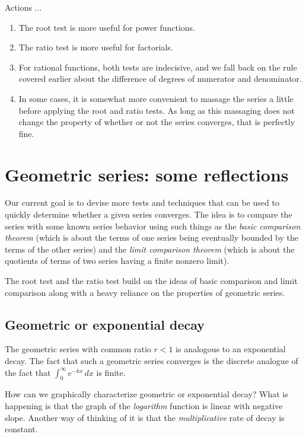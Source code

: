 \documentclass[10pt]{amsart}
\begin{document}
Actions ...

\begin{enumerate}
\item The root test is more useful for power functions.
\item The ratio test is more useful for factorials.
\item For rational functions, both tests are indecisive, and we fall
  back on the rule covered earlier about the difference of degrees of
  numerator and denominator.
\item In some cases, it is somewhat more convenient to massage the
  series a little before applying the root and ratio tests. As long as
  this massaging does not change the property of whether or not the
  series converges, that is perfectly fine.
\end{enumerate}

\section{Geometric series: some reflections}

Our current goal is to devise more tests and techniques that can be
used to quickly determine whether a given series converges. The idea
is to compare the series with some known series behavior using such
things as the {\em basic comparison theorem} (which is about the terms
of one series being eventually bounded by the terms of the other
series) and the {\em limit comparison theorem} (which is about the
quotients of terms of two series having a finite nonzero limit).

The root test and the ratio test build on the ideas of basic
comparison and limit comparison along with a heavy reliance on the
properties of geometric series.

\subsection{Geometric or exponential decay}

The geometric series with common ratio $r < 1$ is analogous to an
exponential decay. The fact that such a geometric series converges is
the discrete analogue of the fact that $\int_0^\infty e^{-kx} \, dx$
is finite.

How can we graphically characterize geometric or exponential decay?
What is happening is that the graph of the {\em logarithm} function is
linear with negative slope. Another way of thinking of it is that the
{\em multiplicative} rate of decay is constant.
\end{document}
